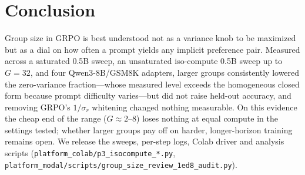 \section{Conclusion}
\label{sec:p3-conclusion}
Group size in GRPO is best understood not as a variance knob to be maximized but as
a dial on how often a prompt yields any implicit preference pair. Measured across a
saturated 0.5B sweep, an unsaturated iso-compute 0.5B sweep up to $G{=}32$, and
four Qwen3-8B/GSM8K adapters, larger groups consistently lowered the zero-variance
fraction---whose measured level exceeds the homogeneous closed form because prompt
difficulty varies---but did not raise held-out accuracy, and removing GRPO's
$1/\sigma_r$ whitening changed nothing measurable. On this evidence the cheap end of
the range ($G\approx2$--$8$) loses nothing at equal compute in the settings tested;
whether larger groups pay off on harder, longer-horizon training remains open. We
release the sweeps, per-step logs, Colab driver and analysis scripts
(\texttt{platform\_colab/p3\_isocompute\_*.py},
\texttt{platform\_modal/scripts/group\_size\_review\_1ed8\_audit.py}).
